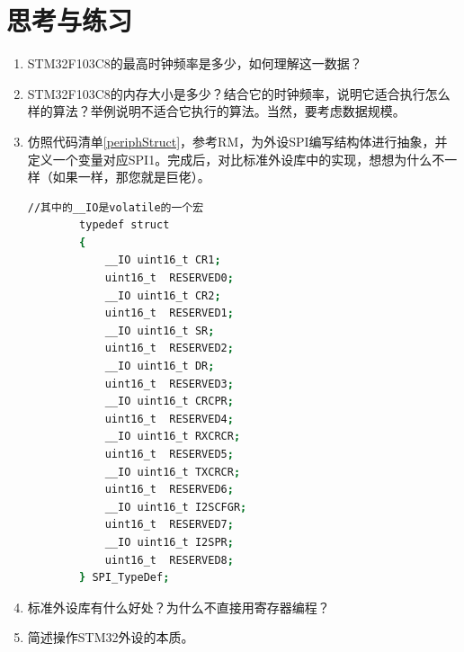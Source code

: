 \section{思考与练习}
\begin{enumerate}
	\item STM32F103C8的最高时钟频率是多少，如何理解这一数据？
	\item STM32F103C8的内存大小是多少？结合它的时钟频率，说明它适合执行怎么样的算法？举例说明不适合它执行的算法。当然，要考虑数据规模。
	\item 仿照代码清单\ref{periphStruct}，参考\acs{RM}，为外设SPI编写结构体进行抽象，并定义一个变量对应SPI1。完成后，对比标准外设库中的实现，想想为什么不一样（如果一样，那您就是巨佬）。
		\begin{lstlisting}[language=bash, style=customStyleC, caption=标准外设库中的SPI结构体]
		//其中的__IO是volatile的一个宏
		typedef struct
		{
			__IO uint16_t CR1;
			uint16_t  RESERVED0;
			__IO uint16_t CR2;
			uint16_t  RESERVED1;
			__IO uint16_t SR;
			uint16_t  RESERVED2;
			__IO uint16_t DR;
			uint16_t  RESERVED3;
			__IO uint16_t CRCPR;
			uint16_t  RESERVED4;
			__IO uint16_t RXCRCR;
			uint16_t  RESERVED5;
			__IO uint16_t TXCRCR;
			uint16_t  RESERVED6;
			__IO uint16_t I2SCFGR;
			uint16_t  RESERVED7;
			__IO uint16_t I2SPR;
			uint16_t  RESERVED8;  
		} SPI_TypeDef;
		\end{lstlisting}
	\item 标准外设库有什么好处？为什么不直接用寄存器编程？
	\item 简述操作STM32外设的本质。
\end{enumerate}












